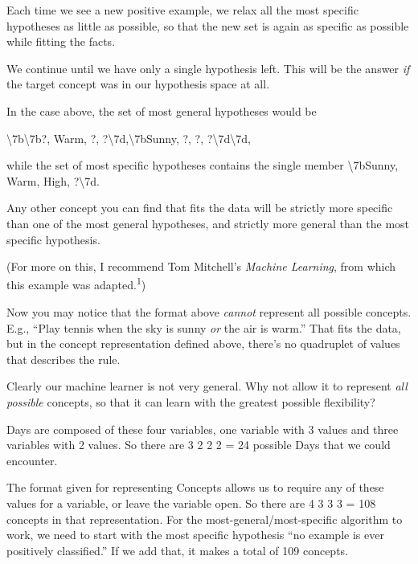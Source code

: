 {
 Each time we see a new positive example, we relax all the most
specific hypotheses as little as possible, so that the new set is again
as specific as possible while fitting the facts.}

{
 We continue until we have only a single hypothesis left. This will
be the answer \textit{if} the target concept was in our hypothesis
space at all.}

{
 In the case above, the set of most general hypotheses would be}

{\centering
 {\textbackslash}{\textquotesingle}7b{\textbackslash}{\textquotesingle}7b?,
Warm, ?,
?{\textbackslash}{\textquotesingle}7d,{\textbackslash}{\textquotesingle}7bSunny,
?, ?,
?{\textbackslash}{\textquotesingle}7d{\textbackslash}{\textquotesingle}7d,
\par}


\bigskip

{
 while the set of most specific hypotheses contains the single
member {\textbackslash}{\textquotesingle}7bSunny, Warm, High,
?{\textbackslash}{\textquotesingle}7d. }

{
 Any other concept you can find that fits the data will be strictly
more specific than one of the most general hypotheses, and strictly
more general than the most specific hypothesis.}

{
 (For more on this, I recommend Tom Mitchell's
\textit{Machine Learning}, from which this example was
adapted.\textsuperscript{1})}

{
 Now you may notice that the format above \textit{cannot} represent
all possible concepts. E.g., ``Play tennis when the
sky is sunny \textit{or} the air is warm.'' That fits
the data, but in the concept representation defined above,
there's no quadruplet of values that describes the
rule.}

{
 Clearly our machine learner is not very general. Why not allow it
to represent \textit{all possible} concepts, so that it can learn with
the greatest possible flexibility?}

{
 Days are composed of these four variables, one variable with 3
values and three variables with 2 values. So there are 3 {\texttimes} 2
{\texttimes} 2 {\texttimes} 2 = 24 possible Days that we could
encounter.}

{
 The format given for representing Concepts allows us to require
any of these values for a variable, or leave the variable open. So
there are 4 {\texttimes} 3 {\texttimes} 3 {\texttimes} 3 = 108 concepts
in that representation. For the most-general/most-specific algorithm to
work, we need to start with the most specific hypothesis
``no example is ever positively
classified.'' If we add that, it makes a total of 109
concepts.}


